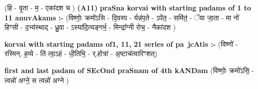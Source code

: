 \documentclass[17pt]{extarticle}
\begin{document}
                  \newline
                      (हि - वृ॒ता - म॒ - एका॑दश च )  \textbf{(A11)} \newline \newline
                \textbf{praSna korvai with starting padams of 1 to 11 anuvAkams :-} \newline
        (विष्णोः॒ क्रमो॑ऽसि - दि॒वस्प - र्यन्न॑प॒ते - ऽपे॑त॒ - समि॑तं॒ - ॅया जा॒ता - मा नो॑ हिꣳसी - द॒भ्य॑स्थाद् - ध्रु॒वा - ऽस्या॑दि॒त्यङ्गर्भ॒ - मिन्द्रा᳚ग्नी रोच॒ - नैका॑दश ) \newline

        \textbf{korvai with starting padams of1, 11, 21 series of pa~jcAtis :-} \newline
        (विष्णो॑ - रस्मिन्. ह॒व्ये - ति॑ त्वा॒ऽहं - धी॒तिभि॒ - र्.होत्रा॑ - अ॒ष्टाच॑त्वारिꣳशत्) \newline

        \textbf{first and last padam of SEcOnd praSnam of 4th kANDam} \newline
        (विष्णोः॒ क्रमो॑ऽसि॒ - त्वन्नो॑ अग्ने॒ स त्वन्नो॑ अग्ने ) \newline 
\end{document}
